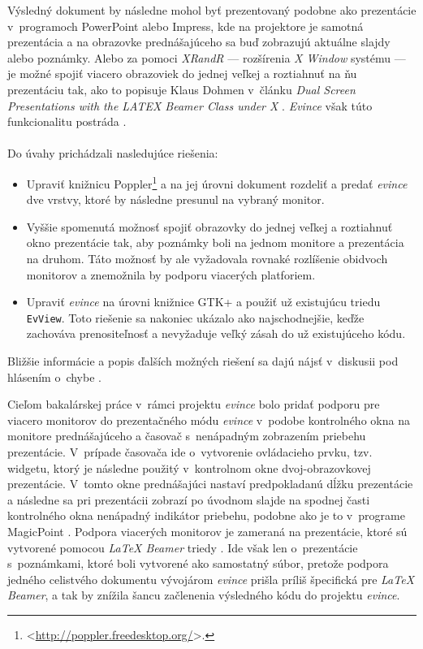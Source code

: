 \documentclass[12pt,oneside,final]{fithesis2}
\begin{document}
Výsledný dokument by následne mohol byť prezentovaný podobne ako prezentácie v~programoch PowerPoint alebo Impress, kde na projektore je samotná prezentácia a na obrazovke prednášajúceho sa buď zobrazujú aktuálne slajdy alebo poznámky. Alebo za pomoci \emph{XRandR} --- rozšírenia \emph{X Window} systému --- je možné spojiť viacero obrazoviek do jednej veľkej a roztiahnuť na ňu prezentáciu tak, ako to popisuje Klaus Dohmen v~článku \emph{Dual Screen Presentations with the LATEX Beamer Class under X} \cite{dohmen}. \emph{Evince} však túto funkcionalitu postráda \cite{evbug}.
\\
\\
Do úvahy prichádzali nasledujúce riešenia:
\begin{itemize}
\item Upraviť knižnicu Poppler\footnote{<\url{http://poppler.freedesktop.org/}>.} a na jej úrovni dokument rozdeliť a predať \emph{evince} dve vrstvy, ktoré by následne presunul na vybraný monitor.
\item Vyššie spomenutá možnosť spojiť obrazovky do jednej veľkej a roztiahnuť okno prezentácie tak, aby poznámky boli na jednom monitore a prezentácia na druhom. Táto možnosť by ale vyžadovala rovnaké rozlíšenie obidvoch monitorov a znemožnila by podporu viacerých platforiem.
\item Upraviť \emph{evince} na úrovni knižnice GTK+ a použiť už existujúcu triedu \texttt{EvView}. Toto riešenie sa nakoniec ukázalo ako najschodnejšie, keďže zachováva prenositeľnosť a nevyžaduje veľký zásah do už existujúceho kódu.
\end{itemize}

Bližšie informácie a popis ďalších možných riešení sa dajú nájsť v~diskusii pod hlásením o~chybe \cite{evbug}.

Cieľom bakalárskej práce v~rámci projektu \emph{evince} bolo pridať podporu pre viacero monitorov do prezentačného módu \emph{evince} v~podobe kontrolného okna na monitore prednášajúceho a časovač s~nenápadným zobrazením priebehu prezentácie.  V~prípade časovača ide o~vytvorenie ovládacieho prvku, tzv. widgetu, ktorý je následne použitý v~kontrolnom okne dvoj-obrazovkovej prezentácie. V~tomto okne prednášajúci nastaví predpokladanú dĺžku prezentácie a následne sa pri prezentácii zobrazí po úvodnom slajde na spodnej časti kontrolného okna nenápadný indikátor priebehu, podobne ako je to v~programe MagicPoint \cite{mgp}. Podpora viacerých monitorov je zameraná na prezentácie, ktoré sú vytvorené pomocou \emph{LaTeX Beamer} triedy \cite{beamer}. Ide však len o~prezentácie s~poznámkami, ktoré boli vytvorené ako samostatný súbor, pretože podpora jedného celistvého dokumentu vývojárom \emph{evince} prišla príliš špecifická pre \emph{LaTeX Beamer}, a tak by znížila šancu začlenenia výsledného kódu do projektu \emph{evince}.
\end{document}
